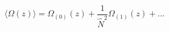 \begin{equation}
\langle \Omega(z)\rangle = \Omega_{(0)}(z) +\frac{1}{\hat{N}^2} 
\Omega_{(1)}(z) +...
\end{equation}

